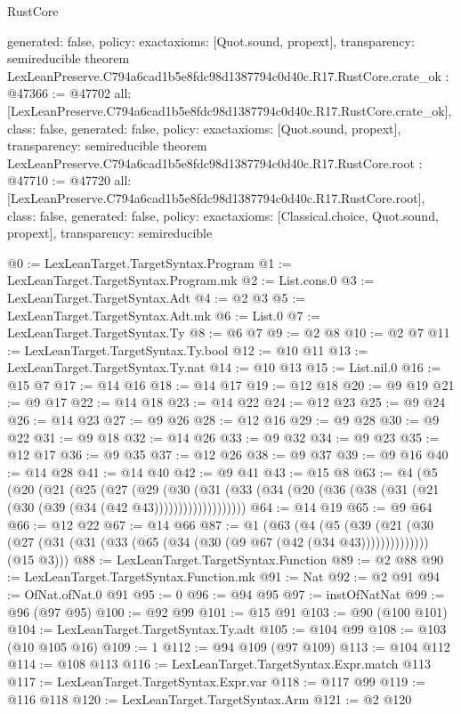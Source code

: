 \begin{lexlean}{RustCore}
\begin{coremodule}
{  generated: false,
  policy: exact{axioms: [Quot.sound, propext]},
  transparency: semireducible
}
theorem LexLeanPreserve.C794a6cad1b5e8fdc98d1387794c0d40c.R17.RustCore.crate_ok : @47366 := @47702 {
  all: [LexLeanPreserve.C794a6cad1b5e8fdc98d1387794c0d40c.R17.RustCore.crate_ok],
  class: false,
  generated: false,
  policy: exact{axioms: [Quot.sound, propext]},
  transparency: semireducible
}
theorem LexLeanPreserve.C794a6cad1b5e8fdc98d1387794c0d40c.R17.RustCore.root : @47710 := @47720 {
  all: [LexLeanPreserve.C794a6cad1b5e8fdc98d1387794c0d40c.R17.RustCore.root],
  class: false,
  generated: false,
  policy: exact{axioms: [Classical.choice, Quot.sound, propext]},
  transparency: semireducible
}

@0 := LexLeanTarget.TargetSyntax.Program
@1 := LexLeanTarget.TargetSyntax.Program.mk
@2 := List.cons.{0}
@3 := LexLeanTarget.TargetSyntax.Adt
@4 := @2 @3
@5 := LexLeanTarget.TargetSyntax.Adt.mk
@6 := List.{0}
@7 := LexLeanTarget.TargetSyntax.Ty
@8 := @6 @7
@9 := @2 @8
@10 := @2 @7
@11 := LexLeanTarget.TargetSyntax.Ty.bool
@12 := @10 @11
@13 := LexLeanTarget.TargetSyntax.Ty.nat
@14 := @10 @13
@15 := List.nil.{0}
@16 := @15 @7
@17 := @14 @16
@18 := @14 @17
@19 := @12 @18
@20 := @9 @19
@21 := @9 @17
@22 := @14 @18
@23 := @14 @22
@24 := @12 @23
@25 := @9 @24
@26 := @14 @23
@27 := @9 @26
@28 := @12 @16
@29 := @9 @28
@30 := @9 @22
@31 := @9 @18
@32 := @14 @26
@33 := @9 @32
@34 := @9 @23
@35 := @12 @17
@36 := @9 @35
@37 := @12 @26
@38 := @9 @37
@39 := @9 @16
@40 := @14 @28
@41 := @14 @40
@42 := @9 @41
@43 := @15 @8
@63 := @4
    (@5
      (@20
        (@21
          (@25
            (@27
              (@29
                (@30
                  (@31 (@33 (@34 (@20 (@36 (@38 (@31 (@21 (@30 (@39 (@34 (@42 @43)))))))))))))))))))
@64 := @14 @19
@65 := @9 @64
@66 := @12 @22
@67 := @14 @66
@87 := @1
    (@63
      (@4
        (@5 (@39 (@21 (@30 (@27 (@31 (@31 (@33 (@65 (@34 (@30 (@9 @67 (@42 (@34 @43))))))))))))))
        (@15 @3)))
@88 := LexLeanTarget.TargetSyntax.Function
@89 := @2 @88
@90 := LexLeanTarget.TargetSyntax.Function.mk
@91 := Nat
@92 := @2 @91
@94 := OfNat.ofNat.{0} @91
@95 := 0
@96 := @94 @95
@97 := instOfNatNat
@99 := @96 (@97 @95)
@100 := @92 @99
@101 := @15 @91
@103 := @90 (@100 @101)
@104 := LexLeanTarget.TargetSyntax.Ty.adt
@105 := @104 @99
@108 := @103 (@10 @105 @16)
@109 := 1
@112 := @94 @109 (@97 @109)
@113 := @104 @112
@114 := @108 @113
@116 := LexLeanTarget.TargetSyntax.Expr.match @113
@117 := LexLeanTarget.TargetSyntax.Expr.var
@118 := @117 @99
@119 := @116 @118
@120 := LexLeanTarget.TargetSyntax.Arm
@121 := @2 @120

\end{coremodule}
\end{lexlean}

